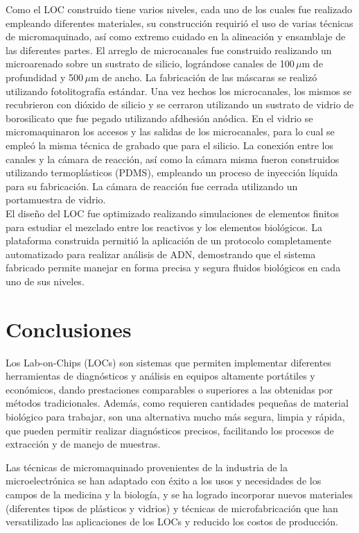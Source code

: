 \documentclass[a4paper, 12pt]{article}
\begin{document}
Como el LOC construido tiene varios niveles, cada uno de los cuales fue realizado empleando diferentes materiales, su construcción requirió el uso de varias técnicas de micromaquinado, así como extremo cuidado en la alineación y ensamblaje de las diferentes partes. El arreglo de microcanales fue construido realizando un microarenado sobre un sustrato de silicio, lográndose canales de 100\,$\mu$m de profundidad y 500\,$\mu$m de ancho. La fabricación de las máscaras se realizó utilizando fotolitografía estándar. Una vez hechos los microcanales, los mismos se recubrieron con dióxido de silicio y se cerraron utilizando un sustrato de vidrio de borosilicato que fue pegado utilizando afdhesión anódica. En el vidrio se micromaquinaron los accesos y las salidas de los microcanales, para lo cual se empleó la misma técnica de grabado que para el silicio. La conexión entre los canales y la cámara de reacción, así como la cámara misma fueron construidos utilizando termoplásticos (PDMS), empleando un proceso de inyección líquida para su fabricación. La cámara de reacción fue cerrada utilizando un portamuestra de vidrio.\\

El diseño del LOC fue optimizado realizando simulaciones de elementos finitos para estudiar el mezclado entre los reactivos y los elementos biológicos. La plataforma construida permitió la aplicación de un protocolo completamente automatizado para realizar análisis de ADN, demostrando que el sistema fabricado permite manejar en forma precisa y segura fluidos biológicos en cada uno de sus niveles.

\section{Conclusiones}
Los Lab-on-Chips (LOCs) son sistemas que permiten implementar diferentes herramientas de diagnósticos y análisis en equipos altamente portátiles y económicos, dando prestaciones comparables o superiores a las obtenidas por métodos tradicionales. Además, como requieren cantidades pequeñas de material biológico para trabajar, son una alternativa mucho más segura, limpia y rá\-pi\-da, que pueden permitir realizar diagnósticos precisos, facilitando los procesos de extracción y de manejo de muestras.

Las técnicas de micromaquinado provenientes de la industria de la microelectrónica se han adaptado con éxito a los usos y necesidades de los campos de la medicina y la biología, y se ha logrado incorporar nuevos materiales (diferentes tipos de plásticos y vidrios) y técnicas de mi\-cro\-fa\-bri\-ca\-ción que han versatilizado las aplicaciones de los LOCs y reducido los costos de producción.
\end{document}
